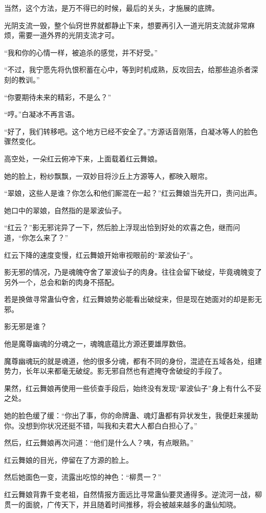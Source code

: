 \begin{this_body}
当然，这个方法，是万不得已的时候，最后的关头，才施展的底牌。

光阴支流一毁，整个仙窍世界就都静止下来，想要再引入一道光阴支流就非常麻烦，需要一道外界的光阴支流才可。

“我和你的心情一样，被追杀的感觉，并不好受。”

“不过，我宁愿先将仇恨积蓄在心中，等到时机成熟，反攻回去，给那些追杀者深刻的教训。”

“你要期待未来的精彩，不是么？”

“哼。”白凝冰不再言语。

“好了，我们转移吧。这个地方已经不安全了。”方源话音刚落，白凝冰等人的脸色骤然变化。

高空处，一朵红云俯冲下来，上面载着红云舞娘。

她的脸上，粉纱飘飘，一双妙目将沙丘上方源等人，都映入眼帘。

“翠娘，这些人是谁？你怎么和他们厮混在一起？”红云舞娘当先开口，责问出声。

她口中的翠娘，自然指的是翠波仙子。

“红云？”影无邪诧异了一下，然后脸上浮现出恰到好处的欢喜之色，继而问道，“你怎么来了？”

红云下降的速度变慢，红云舞娘开始审视眼前的“翠波仙子”。

影无邪的情况，乃是魂魄夺舍了翠波仙子的肉身。往往会留下破绽，毕竟魂魄变了另外一个，总会和新的肉身不搭配。

若是换做寻常蛊仙夺舍，红云舞娘势必能看出破绽来，但是现在她面对的却是影无邪。

影无邪是谁？

他是魔尊幽魂的分魂之一，魂魄底蕴比方源还要雄厚数倍。

魔尊幽魂玩的就是魂道，他的很多分魂，都有不同的身份，混迹在五域各处，组建势力，长年以来都毫无破绽。影无邪自然也有遮掩夺舍破绽的手段了。

果然，红云舞娘再使用一些侦查手段后，始终没有发现“翠波仙子”身上有什么不妥之处。

她的脸色缓了缓：“你出了事，你的命牌蛊、魂灯蛊都有异状发生，我便赶来援助你。没想到你状况还挺不错，叫我和夫君大人都白白担心了。”

然后，红云舞娘再次问道：“他们是什么人？咦，有点眼熟。”

红云舞娘的目光，停留在了方源的脸上。

然后她面色一变，流露出吃惊的神色：“柳贯一？”

红云舞娘背靠千变老祖，自然情报方面远比寻常蛊仙要灵通得多。逆流河一战，柳贯一的面貌，广传天下，并且随着时间推移，将会被越来越多的蛊仙知晓。


\end{this_body}
